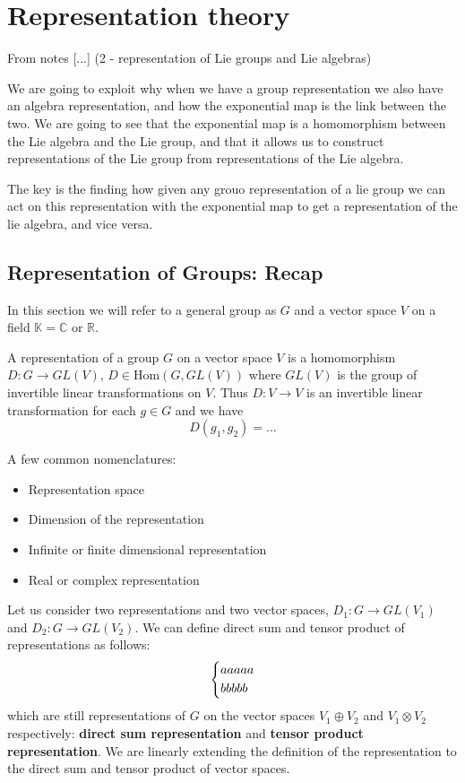 \section{Representation theory}

From notes [...] (2 - representation of Lie groups and Lie algebras)

We are going to exploit why when we have a group representation we also have an algebra representation, and how the exponential map is the link between the two. We are going to see that the exponential map is a homomorphism between the Lie algebra and the Lie group, and that it allows us to construct representations of the Lie group from representations of the Lie algebra.

The key is the finding how given any grouo representation of a lie group we can act on this representation with the exponential map to get a representation of the lie algebra, and vice versa.

\subsection{Representation of Groups: Recap}

In this section we will refer to a general group as \(G\) and a vector space \(V\) on a field \(\mathbb{K} = \mathbb{C}\) or \(\mathbb{R}\).

\begin{definition}
    A representation of a group \(G\) on a vector space \(V\) is a homomorphism \(D: G \to GL(V)\), \(D \in \text{Hom}(G,GL(V))\) where \(GL(V)\) is the group of invertible linear transformations on \(V\). Thus \(D : V \to V\) is an invertible linear transformation for each \(g \in G\) and we have
    \[
        D(g_1,g_2) = \dots
    \]
\end{definition}

A few common nomenclatures:
\begin{itemize}
    \item Representation space
    \item Dimension of the representation
    \item Infinite or finite dimensional representation
    \item Real or complex representation
\end{itemize}

\begin{definition}
    Let us consider two representations and two vector spaces, \(D_1 : G \to GL(V_1)\) and \(D_2 : G \to GL(V_2)\). We can define direct sum and tensor product of representations as follows:
    \[
        \begin{dcases}
            a a a a a \\
            b b b b b
        \end{dcases}
    \]
    which are still representations of \(G\) on the vector spaces \(V_1 \oplus V_2\) and \(V_1 \otimes V_2\) respectively: \textbf{direct sum representation} and \textbf{tensor product representation}. We are linearly extending the definition of the representation to the direct sum and tensor product of vector spaces.
\end{definition}

